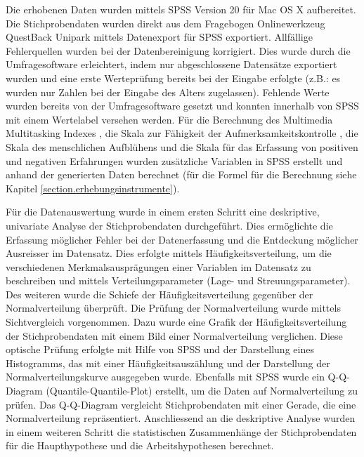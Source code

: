 \label{section.datenaufbereitung}
Die erhobenen Daten wurden mittels SPSS Version 20 für Mac OS X aufbereitet. Die Stichprobendaten wurden direkt aus dem Fragebogen Onlinewerkzeug QuestBack Unipark mittels Datenexport für SPSS exportiert. Allfällige Fehlerquellen wurden bei der Datenbereinigung korrigiert. Dies wurde durch die Umfragesoftware erleichtert, indem nur abgeschlossene Datensätze exportiert wurden und eine erste Werteprüfung bereits bei der Eingabe erfolgte (z.B.: es wurden nur Zahlen bei der Eingabe des Alters zugelassen). Fehlende Werte wurden bereits von der Umfragesoftware gesetzt und konnten innerhalb von SPSS mit einem Wertelabel versehen werden. Für die Berechnung des Multimedia Multitasking Indexes \cite{Ophir2009}, die Skala zur Fähigkeit der Aufmerksamkeitskontrolle \cite{Posner1998}, die Skala des menschlichen Aufblühens \cite{Diener:2010} und die Skala für das Erfassung von positiven und negativen Erfahrungen \cite{Diener:2010} wurden zusätzliche Variablen in SPSS erstellt und anhand der generierten Daten berechnet (für die Formel für die Berechnung siehe Kapitel \ref{section.erhebungsinstrumente}). 

\label{section.statistischeVerfahren}
Für die Datenauswertung wurde in einem ersten Schritt eine deskriptive, univariate Analyse der Stichprobendaten durchgeführt. Dies ermöglichte die Erfassung möglicher Fehler bei der Datenerfassung und die Entdeckung möglicher Ausreisser im Datensatz. Dies erfolgte mittels Häufigkeitsverteilung, um die verschiedenen Merkmalsausprägungen einer Variablen im Datensatz zu beschreiben und mittels Verteilungsparameter (Lage- und Streuungsparameter). Des weiteren wurde die Schiefe der Häufigkeitsverteilung gegenüber der Normalverteilung überprüft. Die Prüfung der Normalverteilung wurde mittels Sichtvergleich vorgenommen. Dazu wurde eine Grafik der Häufigkeitsverteilung der Stichprobendaten mit einem Bild einer Normalverteilung verglichen. Diese optische Prüfung erfolgte mit Hilfe von SPSS und der Darstellung eines Histogramms, das mit einer Häufigkeitsauszählung und der Darstellung der Normalverteilungskurve ausgegeben wurde. Ebenfalls mit SPSS wurde ein Q-Q-Diagram (Quantile-Quantile-Plot) erstellt, um die Daten auf Normalverteilung zu prüfen. Das Q-Q-Diagram vergleicht Stichprobendaten mit einer Gerade, die eine Normalverteilung repräsentiert. Anschliessend an die deskriptive Analyse wurden in einem weiteren Schritt die statistischen Zusammenhänge der Stichprobendaten für die Haupthypothese und die Arbeitshypothesen berechnet. 

